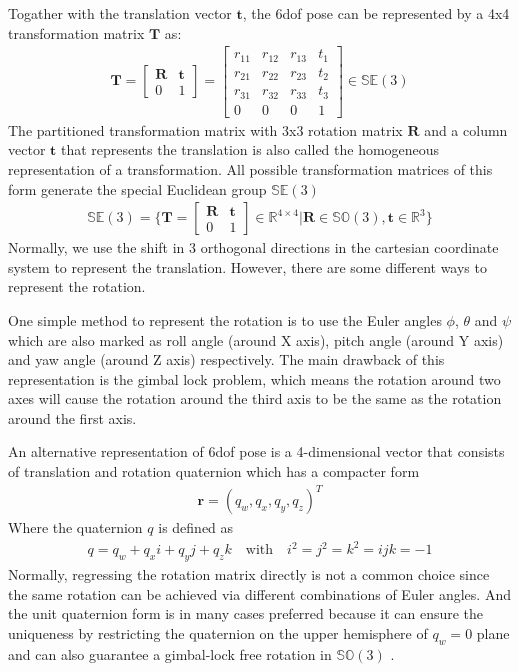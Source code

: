 \documentclass[12pt,DIV14,BCOR12mm,a4paper,footinclude=false,headinclude,parskip=half-,twoside,openright,cleardoublepage=empty,toc=index,bibliography=totoc,listof=totoc]{scrreprt}
\numberwithin{equation}{chapter}
\begin{document}
Togather with the translation vector $\mathbf{t}$, the \gls{6dof} pose can be represented by a 4x4 transformation matrix $\mathbf{T}$ as:
\begin{align}
  \mathbf{T} = \begin{bmatrix}
    \mathbf{R} & \mathbf{t} \\
    0 & 1
  \end{bmatrix}
  = \begin{bmatrix}
    r_{11} & r_{12} & r_{13} & t_{1} \\
    r_{21} & r_{22} & r_{23} & t_{2} \\
    r_{31} & r_{32} & r_{33} & t_{3} \\
    0 & 0 & 0 & 1
  \end{bmatrix}
  \in \mathbb{S} \mathbb{E} (3)
\end{align}
The partitioned transformation matrix with 3x3 rotation matrix $\mathbf{R}$ and a column vector $\mathbf{t}$ that represents the translation is also called the homogeneous representation of a transformation. All possible transformation matrices of this form generate the special Euclidean group $\mathbb{S} \mathbb{E} (3)$
\begin{align}
  \mathbb{S} \mathbb{E} (3) = \{\mathbf{T} = \begin{bmatrix}
    \mathbf{R} & \mathbf{t} \\
    0 & 1
  \end{bmatrix}\in \mathbb{R}^{4 \times 4}| \mathbf{R} \in \mathbb{S} \mathbb{O} (3), \mathbf{t} \in \mathbb{R}^{3} \}
\end{align}
Normally, we use the shift in 3 orthogonal directions in the cartesian coordinate system to represent the translation. However, there are some different ways to represent the rotation.

One simple method to represent the rotation is to use the Euler angles $\phi$, $\theta$ and $\psi$ which are also marked as roll angle (around X axis), pitch angle (around Y axis) and yaw angle (around Z axis) respectively. The main drawback of this representation is the gimbal lock problem, which means the rotation around two axes will cause the rotation around the third axis to be the same as the rotation around the first axis.

An alternative representation of \gls{6dof} pose is a 4-dimensional vector that consists of translation and rotation quaternion which has a compacter form
\begin{align}
  \mathbf{r} = (q_{w}, q_{x}, q_{y}, q_{z})^{T}
\end{align}
Where the quaternion $q$ is defined as
\begin{align}
  q = q_{w} + q_{x}i + q_{y}j + q_{z}k \quad \textrm{with} \quad i^{2} = j^{2} = k^{2} = ijk = -1
\end{align}
Normally, regressing the rotation matrix directly is not a common choice since the same rotation can be achieved via different combinations of Euler angles. And the unit quaternion form is in many cases preferred because it can ensure the uniqueness by restricting the quaternion on the upper hemisphere of $q_{w}=0$ plane and can also guarantee a gimbal-lock free rotation in $\mathbb{S} \mathbb{O} (3)$ \cite{9231126}. 
\end{document}
